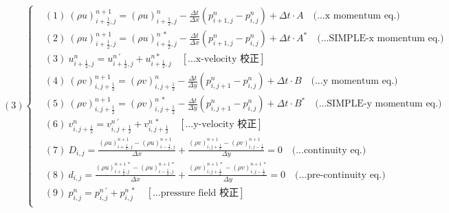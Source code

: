 \documentclass[12pt]{article}
\begin{document}
\begin{equation}
(3)
\left\{
\begin{aligned}
    &(1)\ (\rho u)_{i+\frac{1}{2},j}^{n+1} = (\rho u)_{i+\frac{1}{2},j}^{n} - \frac{\Delta t}{\Delta x}(p_{i+1,j}^{n} - p_{i,j}^{n}) + \Delta t \cdot A  \quad \text{(...x momentum eq.)}\\[1.5ex]
    &(2)\ (\rho u)_{i+\frac{1}{2},j}^{n+1} = (\rho u)_{i+\frac{1}{2},j}^{n\ *} - \frac{\Delta t}{\Delta x}(p_{i+1,j}^{n} - p_{i,j}^{n}) + \Delta t \cdot A^{*}  \quad \text{(...SIMPLE-x momentum eq.)}\\[1.5ex]
    &(3)\ u_{i+\frac{1}{2},j}^{n} = u_{i+\frac{1}{2},j}^{n\ '} + u_{i+\frac{1}{2},j}^{n *}  \quad \left[\text{...x-velocity 校正}\right]\\[1.5ex]
    &(4)\ (\rho v)_{i,j+\frac{1}{2}}^{n+1} = (\rho v)_{i,j+\frac{1}{2}}^{n} - \frac{\Delta t}{\Delta y}(p_{i,j+1}^{n} - p_{i,j}^{n}) + \Delta t \cdot B  \quad \text{(...y momentum eq.)}\\[1.5ex]
    &(5)\ (\rho v)_{i,j+\frac{1}{2}}^{n+1} = (\rho v)_{i,j+\frac{1}{2}}^{n\ *} - \frac{\Delta t}{\Delta y}(p_{i,j+1}^{n} - p_{i,j}^{n}) + \Delta t \cdot B^{*}  \quad \text{(...SIMPLE-y momentum eq.)}\\[1.5ex]
    &(6)\ v_{i,j+\frac{1}{2}}^{n} = v_{i,j+\frac{1}{2}}^{n\ \prime} + v_{i,j+\frac{1}{2}}^{n\ *} \quad \left[\text{...y-velocity 校正}\right]\\[1.5ex]
    &(7)\ D_{i,j} = \frac{(\rho u)_{i+\frac{1}{2},j}^{n+1} - (\rho u)_{i-\frac{1}{2},j}^{n+1}}{\Delta x} + \frac{(\rho v)_{i,j+\frac{1}{2}}^{n+1} - (\rho v)_{i,j-\frac{1}{2}}^{n+1}}{\Delta y} = 0 \quad \text{(...continuity eq.)}\\[1.5ex]
    &(8)\ d_{i,j} = \frac{(\rho u)_{i+\frac{1}{2},j}^{n+1\ *} - (\rho u)_{i-\frac{1}{2},j}^{n+1\ *}}{\Delta x} + \frac{(\rho v)_{i,j+\frac{1}{2}}^{n+1\ *} - (\rho v)_{i,j-\frac{1}{2}}^{n+1\ *}}{\Delta y} = 0 \quad \text{(...pre-continuity eq.)}\\[1.5ex]
    &(9)\ p_{i,j}^{n} = p_{i,j}^{n\ \prime} + p_{i,j}^{n\ *} \quad\left[\text{...pressure field 校正}\right]\\[1.5ex]
\end{aligned}
\right.
\end{equation}
\newpage
\end{document}

